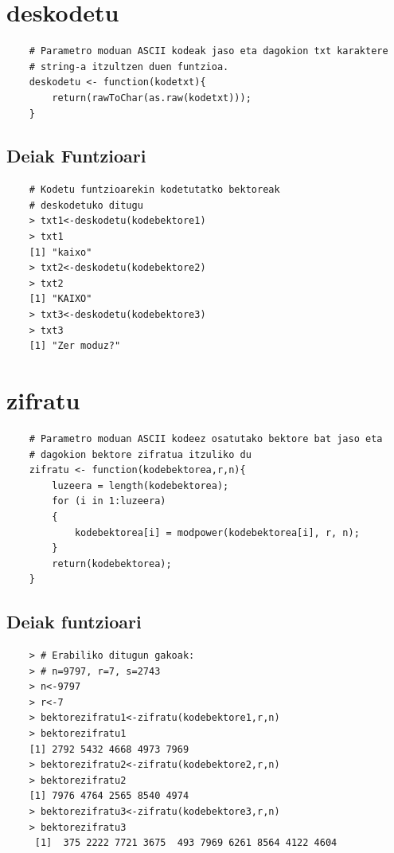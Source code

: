 \documentclass[12pt]{basque-book}
\begin{document}
\newpage

\section{deskodetu}
\begin{verbatim}
    # Parametro moduan ASCII kodeak jaso eta dagokion txt karaktere 
    # string-a itzultzen duen funtzioa.
    deskodetu <- function(kodetxt){
        return(rawToChar(as.raw(kodetxt)));
    }   
\end{verbatim}

\subsection{Deiak Funtzioari}
\begin{verbatim}
    # Kodetu funtzioarekin kodetutatko bektoreak 
    # deskodetuko ditugu
    > txt1<-deskodetu(kodebektore1)
    > txt1
    [1] "kaixo"
    > txt2<-deskodetu(kodebektore2)
    > txt2
    [1] "KAIXO"
    > txt3<-deskodetu(kodebektore3)
    > txt3
    [1] "Zer moduz?"
\end{verbatim}

\newpage

\section{zifratu}
\begin{verbatim}
    # Parametro moduan ASCII kodeez osatutako bektore bat jaso eta 
    # dagokion bektore zifratua itzuliko du
    zifratu <- function(kodebektorea,r,n){
        luzeera = length(kodebektorea);
        for (i in 1:luzeera)
        {
            kodebektorea[i] = modpower(kodebektorea[i], r, n);
        }
        return(kodebektorea);
    }
\end{verbatim}

\subsection{Deiak funtzioari}
\begin{verbatim}
    > # Erabiliko ditugun gakoak:
    > # n=9797, r=7, s=2743
    > n<-9797
    > r<-7
    > bektorezifratu1<-zifratu(kodebektore1,r,n)
    > bektorezifratu1
    [1] 2792 5432 4668 4973 7969
    > bektorezifratu2<-zifratu(kodebektore2,r,n)
    > bektorezifratu2
    [1] 7976 4764 2565 8540 4974
    > bektorezifratu3<-zifratu(kodebektore3,r,n)
    > bektorezifratu3
     [1]  375 2222 7721 3675  493 7969 6261 8564 4122 4604
\end{verbatim}
\end{document}
